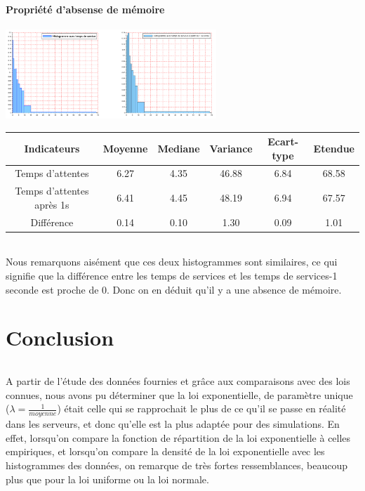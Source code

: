 \documentclass{article}
\begin{document}
\subsection{Propriété d'absense de mémoire}
\begin{center}
\includegraphics[width=300px]{img/S3_mem.png}
\end{center}

\begin{center}
\begin{tabular}{|c|c|c|c|c|c|}
  \hline
  Indicateurs & Moyenne & Mediane & Variance & Ecart-type & Etendue \\
  \hline
  Temps d'attentes & 6.27 & 4.35 & 46.88 & 6.84 & 68.58 \\
  Temps d'attentes après 1s & 6.41 & 4.45 & 48.19 & 6.94 & 67.57 \\
  Différence & 0.14 & 0.10 & 1.30 & 0.09 & 1.01 \\
  \hline
\end{tabular}
\end{center}

\paragraph{}
Nous remarquons aisément que ces deux histogrammes sont similaires, ce qui signifie que la différence entre les temps de services et les temps de services-1 seconde est proche de 0. Donc on en déduit qu’il y a une absence de mémoire.

\part{Conclusion}

\paragraph{}
A partir de l’étude des données fournies et grâce aux comparaisons avec des lois connues, nous avons pu déterminer que la loi exponentielle, de paramètre unique ($\lambda = \frac{1}{moyenne}$)  était celle qui se rapprochait le plus de ce qu’il se passe en réalité dans les serveurs, et donc qu’elle est la plus adaptée pour des simulations. En effet, lorsqu’on compare la fonction de répartition de la loi exponentielle à celles empiriques, et lorsqu’on compare la densité de la loi exponentielle avec les histogrammes des données, on remarque de très fortes ressemblances, beaucoup plus que pour la loi uniforme ou la loi normale. 
\end{document}
